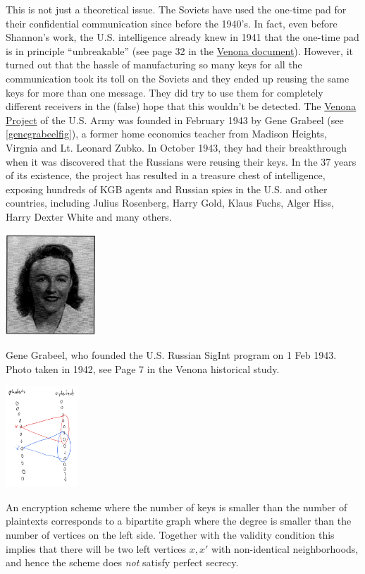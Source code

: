 This is not just a theoretical issue. The Soviets have used the one-time
pad for their confidential communication since before the 1940's. In
fact, even before Shannon's work, the U.S. intelligence already knew in
1941 that the one-time pad is in principle ``unbreakable'' (see page 32
in the \href{http://nsarchive.gwu.edu/NSAEBB/NSAEBB278/01.PDF}{Venona
document}). However, it turned out that the hassle of manufacturing so
many keys for all the communication took its toll on the Soviets and
they ended up reusing the same keys for more than one message. They did
try to use them for completely different receivers in the (false) hope
that this wouldn't be detected. The
\href{https://en.wikipedia.org/wiki/Venona_project}{Venona Project} of
the U.S. Army was founded in February 1943 by Gene Grabeel (see
\cref{genegrabeelfig}), a former home economics teacher from Madison
Heights, Virgnia and Lt. Leonard Zubko. In October 1943, they had their
breakthrough when it was discovered that the Russians were reusing their
keys. In the 37 years of its existence, the project has resulted in a
treasure chest of intelligence, exposing hundreds of KGB agents and
Russian spies in the U.S. and other countries, including Julius
Rosenberg, Harry Gold, Klaus Fuchs, Alger Hiss, Harry Dexter White and
many others.


\begin{marginfigure}
\centering
\includegraphics[width=\linewidth, height=1.5in, keepaspectratio]{../figure/genevenona.png}
\caption{Gene Grabeel, who founded the U.S. Russian SigInt program on 1
Feb 1943. Photo taken in 1942, see Page 7 in the Venona historical
study.}
\label{genegrabeelfig}
\end{marginfigure}


\begin{marginfigure}
\centering
\includegraphics[width=\linewidth, height=1.5in, keepaspectratio]{../figure/longkeygraph.png}
\caption{An encryption scheme where the number of keys is smaller than
the number of plaintexts corresponds to a bipartite graph where the
degree is smaller than the number of vertices on the left side. Together
with the validity condition this implies that there will be two left
vertices \(x,x'\) with non-identical neighborhoods, and hence the scheme
does \emph{not} satisfy perfect secrecy.}
\label{longkeygraphfig}
\end{marginfigure}

